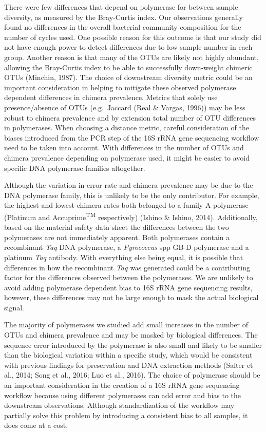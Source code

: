 \documentclass[11pt,]{article}
\begin{document}
There were few differences that depend on polymerase for between sample
diversity, as measured by the Bray-Curtis index. Our observations
generally found no differences in the overall bacterial community
composition for the number of cycles used. One possible reason for this
outcome is that our study did not have enough power to detect
differences due to low sample number in each group. Another reason is
that many of the OTUs are likely not highly abundant, allowing the
Bray-Curtis index to be able to successfully down-weight chimeric OTUs
(Minchin, 1987). The choice of downstream diversity metric could be an
important consideration in helping to mitigate these observed polymerase
dependent differences in chimera prevalence. Metrics that solely use
presence/absence of OTUs (e.g.~Jaccard (Real \& Vargas, 1996)) may be
less robust to chimera prevalence and by extension total number of OTU
differences in polymerases. When choosing a distance metric, careful
consideration of the biases introduced from the PCR step of the 16S rRNA
gene sequencing workflow need to be taken into account. With differences
in the number of OTUs and chimera prevalence depending on polymerase
used, it might be easier to avoid specific DNA polymerase families
altogether.

Although the variation in error rate and chimera prevalence may be due
to the DNA polymerase family, this is unlikely to be the only
contributor. For example, the highest and lowest chimera rates both
belonged to a family A polymerase (Platinum and
Accuprime\textsuperscript{TM} respectively) (Ishino \& Ishino, 2014).
Additionally, based on the material safety data sheet the differences
between the two polymerases are not immediately apparent. Both
polymerases contain a recombinant \emph{Taq} DNA polymerase, a
\emph{Pyrococcus} spp GB-D polymerase and a platinum \emph{Taq}
antibody. With everything else being equal, it is possible that
differences in how the recombinant \emph{Taq} was generated could be a
contributing factor for the differences observed between the
polymerases. We are unlikely to avoid adding polymerase dependent bias
to 16S rRNA gene sequencing results, however, these differences may not
be large enough to mask the actual biological signal.

The majority of polymerases we studied add small increases in the number
of OTUs and chimera prevalence and may be masked by biological
differences. The sequence error introduced by the polymerase is also
small and likely to be smaller than the biological variation within a
specific study, which would be consistent with previous findings for
preservation and DNA extraction methods (Salter et al., 2014; Song et
al., 2016; Luo et al., 2016). The choice of polymerase should be an
important consideration in the creation of a 16S rRNA gene sequencing
workflow because using different polymerases can add error and bias to
the downstream observations. Although standardization of the workflow
may partially solve this problem by introducing a consistent bias to all
samples, it does come at a cost.
\end{document}
